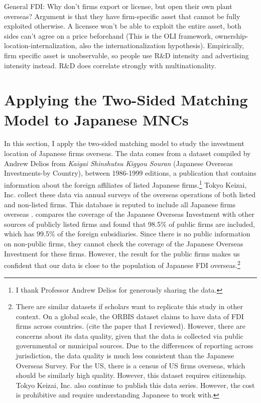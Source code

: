 General FDI: Why don't firms export or license, but open their own plant
overseas? Argument is that they have firm-specific asset that cannot be fully
exploited otherwise. A licensee won't be able to exploit the entire asset, both
sides can't agree on a price beforehand (This is the OLI framework,
ownership-location-internalization, also the internationalization hypothesis). Empirically, firm specific asset is
unobservable, so people use R\&D intensity and advertising intensity instead.
R\&D does correlate strongly with multinationality.


\section{Applying the Two-Sided Matching Model to Japanese MNCs}
\label{sec:application}

In this section, I apply the two-sided matching model to study the investment
location of Japanese firms overseas. The data comes from a dataset compiled by
Andrew Delios from \textit{Kaigai
  Shinshutsu Kigyou Souran} (Japanese Overseas Investments-by Country), between
1986-1999 editions, a publication that contains information
about the foreign affiliates of listed Japanese firms.\footnote{I thank Professor Andrew Delios for
  generously sharing the data.} Tokyo Keizai, Inc. collect these data via annual
surveys of the overseas operations of both listed and non-listed firms. This database is reputed to include all Japanese
firms overseas \citep{Yamawaki1991}. \citep{Delios2001} compares the coverage of
the Japanese Overseas Investment with other sources of publicly listed firms and
found that 98.5\% of public firms are included, which has 99.5\% of the foreign
subsidiaries. Since there is no public information on non-public firms, they
cannot check the coverage of the Japanese Overseas Investment for these firms.
However, the result for the public firms makes us confident that our data is
close to the population of Japanese FDI overseas.\footnote{There are similar
  datasets if scholars want to replicate this study in other context. On a
  global scale, the ORBIS dataset claims to have data of FDI firms across
  countries. (cite the paper that I reviewed). However, there are concerns about
  its data quality, given that the data is collected via public governmental or
  municipal sources. Due to the differences of reporting across jurisdiction,
  the data quality is much less consistent than the Japanese Overseas Survey. For the US, there is a census of
  US firms overseas, which should be similarly high quality. However, this
  dataset requires citizenship. Tokyo Keizai, Inc. also continue to publish this
data series. However, the cost is prohibitive and require understanding Japanese
to work with.}



